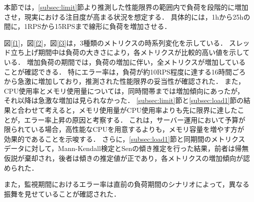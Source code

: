 \documentclass[twoside,twocolumn,10pt]{jarticle}  %
\begin{document}
本節では，\ref{subsec:limit}節より推測した性能限界の範囲内で負荷を段階的に増加させ，現実における注目度が高まる状況を想定する．
具体的には，1hから25hの間に，1RPSから15RPSまで線形に負荷を増加させる．

図\ref{f1}，図\ref{f2}，図\ref{f3}は，3種類のメトリクスの時系列変化を示している．
スレッド立ち上げ期間中は負荷の大きさにより，各メトリクスが比較的高い値を示している．
増加負荷の期間では，負荷の増加に伴い，全メトリクスが増加していることが確認できる．
特にエラー率は，負荷が約10RPS程度に達する16時間ごろから急激に増加しており，推測された性能限界の妥当性が確認された．
また，CPU使用率とメモリ使用量については，同時間帯までは増加傾向にあったが，それ以降は急激な増加は見られなかった．
\ref{subsec:limit}節と\ref{subsec:load1}節の結果と合わせて考えると，メモリ使用量がCPU使用率よりも先に限界に達したことが，エラー率上昇の原因と考察する．
これは，サーバー運用において予算が限られている場合，高性能なCPUを用意するよりも，メモリ容量を増やす方が効果的であることを示唆する．
さらに，\ref{subsec:load1}節と同期間のメトリクスデータに対して，Mann-Kendall検定とSenの傾き推定を行った結果，前者は帰無仮説が棄却され，後者は傾きの推定値が正であり，各メトリクスの増加傾向が認められた．\par
また，監視期間におけるエラー率は直前の負荷期間のシナリオによって，異なる振舞を見せていることが確認された．
\end{document}
